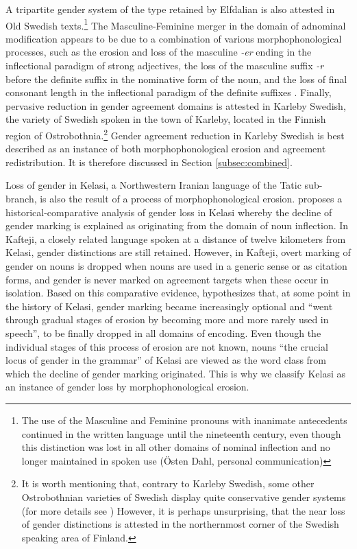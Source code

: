 \documentclass[output=collectionpaper]{langsci/langscibook}
\begin{document}
A tripartite gender system of the type retained by Elfdalian is also attested in Old Swedish texts.\footnote{The use of the Masculine and Feminine pronouns with inanimate antecedents continued in the written language until the nineteenth century, even though this distinction was lost in all other domains of nominal inflection and no longer maintained in spoken use (\"{O}sten Dahl, personal communication)} The Masculine-Feminine merger in the domain of adnominal modification appears to be due to a combination of various morphophonological processes, such as the erosion and loss of the masculine \textit{-er} ending in the inflectional paradigm of strong adjectives, the loss of the masculine suffix \textit{-r} before the definite suffix in the nominative form of the noun, and the loss of final consonant length in the inflectional paradigm of the definite suffixes \citep[652--654]{Duke2010}. Finally, pervasive reduction in gender agreement domains is attested in Karleby Swedish, the variety of Swedish spoken in the town of Karleby, located in the Finnish region of Ostrobothnia.\footnote{It is worth mentioning that, contrary to Karleby Swedish, some other Ostrobothnian varieties of Swedish display quite conservative gender systems (for more details see \citealt[40--50]{Hulden1972}) However, it is perhaps unsurprising, that the near loss of gender distinctions is attested in the northernmost corner of the Swedish speaking area of Finland.} Gender agreement reduction in Karleby Swedish is best described as an instance of both morphophonological erosion and agreement redistribution. It is therefore discussed in Section \ref{subsec:combined}.

Loss of gender in Kelasi, a Northwestern Iranian language of the Tatic sub-branch, is also the result of a process of morphophonological erosion. \citet{Stilotoappear} proposes a historical-comparative analysis of gender loss in Kelasi whereby the decline of gender marking is explained as originating from the domain of noun inflection. In Kafteji, a closely related language spoken at a distance of twelve kilometers from Kelasi, gender distinctions are still retained. However, in Kafteji, overt marking of gender on nouns is dropped when nouns are used in a generic sense or as citation forms, and gender is never marked on agreement targets when these occur in isolation. Based on this comparative evidence, \citet[27]{Stilotoappear} hypothesizes that, at some point in the history of Kelasi, gender marking became increasingly optional and ``went through gradual stages of erosion by becoming more and more rarely used in speech'', to be finally dropped in all domains of encoding. Even though the individual stages of this process of erosion are not known, nouns \textendash{} ``the crucial locus of gender in the grammar'' of Kelasi \citep[27]{Stilotoappear} \textendash{} are viewed as the word class from which the decline of gender marking originated. This is why we classify Kelasi as an instance of gender loss by morphophonological erosion.
\end{document}
